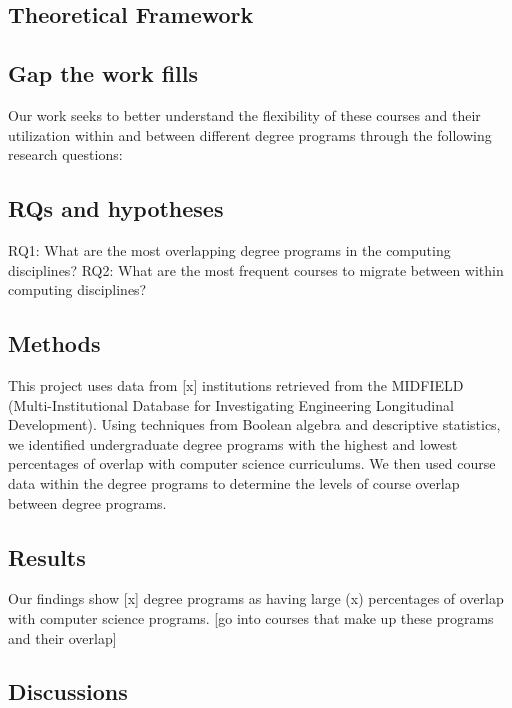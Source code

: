 \documentclass[
  journal,
]{IEEEtran}%
\begin{document}
\hypertarget{theoretical-framework}{%
\subsection{Theoretical Framework}\label{theoretical-framework}}

\hypertarget{gap-the-work-fills}{%
\subsection{Gap the work fills}\label{gap-the-work-fills}}

Our work seeks to better understand the flexibility of these courses and
their utilization within and between different degree programs through
the following research questions:

\hypertarget{rqs-and-hypotheses}{%
\subsection{RQs and hypotheses}\label{rqs-and-hypotheses}}

RQ1: What are the most overlapping degree programs in the computing
disciplines? RQ2: What are the most frequent courses to migrate between
within computing disciplines?

\hypertarget{methods}{%
\subsection{Methods}\label{methods}}

This project uses data from {[}x{]} institutions retrieved from the
MIDFIELD (Multi-Institutional Database for Investigating Engineering
Longitudinal Development). Using techniques from Boolean algebra and
descriptive statistics, we identified undergraduate degree programs with
the highest and lowest percentages of overlap with computer science
curriculums. We then used course data within the degree programs to
determine the levels of course overlap between degree programs.

\hypertarget{results}{%
\subsection{Results}\label{results}}

Our findings show {[}x{]} degree programs as having large (x)
percentages of overlap with computer science programs. {[}go into
courses that make up these programs and their overlap{]}

\hypertarget{discussions}{%
\subsection{Discussions}\label{discussions}}
\end{document}
